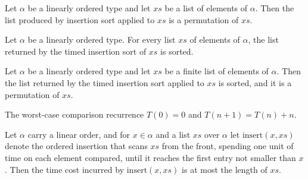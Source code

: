 \begin{theorem}
\label{insertionSort_perm}
\leanok
{}
Let $\alpha$ be a linearly ordered type and let $\mathit{xs}$ be a list of elements of
$\alpha$. Then the list produced by insertion sort applied to $\mathit{xs}$ is a
permutation of $\mathit{xs}$.
\end{theorem}

\begin{theorem}
\label{insertionSort_sorted}
\leanok
{}
Let $\alpha$ be a linearly ordered type. For every list $\mathit{xs}$ of elements of
$\alpha$, the list returned by the timed insertion sort of $\mathit{xs}$ is sorted.
\end{theorem}

\begin{theorem}
\label{insertionSort_correct}
\leanok
{}
Let $\alpha$ be a linearly ordered type and let $\mathit{xs}$ be a finite list of
elements of $\alpha$. Then the list returned by the timed insertion sort applied to
$\mathit{xs}$ is sorted, and it is a permutation of $\mathit{xs}$.
\end{theorem}

\begin{definition}
\label{timeInsertionSortRec}
\leanok
The worst-case comparison recurrence $T(0) = 0$ and $T(n+1) = T(n) + n$.
\end{definition}

\begin{theorem}
\label{time_insert_le}
\leanok
{}
Let $\alpha$ carry a linear order, and for $x \in \alpha$ and a list $\mathit{xs}$ over
$\alpha$ let $\mathrm{insert}(x, \mathit{xs})$ denote the ordered insertion that scans
$\mathit{xs}$ from the front, spending one unit of time on each element compared, until
it reaches the first entry not smaller than $x$. Then the time cost incurred by
$\mathrm{insert}(x, \mathit{xs})$ is at most the length of $\mathit{xs}$.
\end{theorem}


